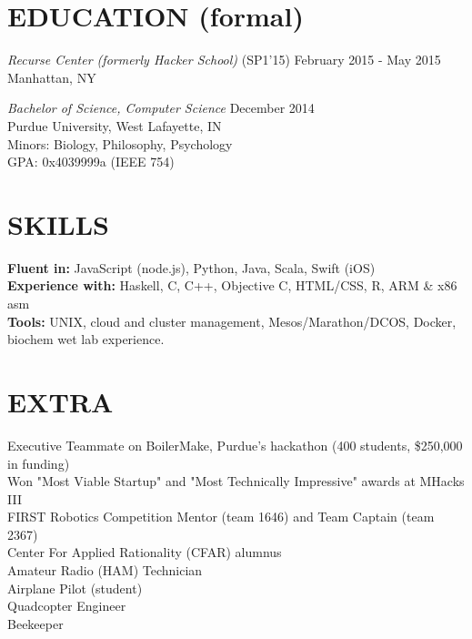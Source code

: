 \documentclass[margin,4pt]{res} %
\begin{document}
\begin{resume}
\section{EDUCATION (formal)}
	{\sl Recurse Center (formerly Hacker School)} \hfill (SP1'15) February 2015 - May 2015\\
		Manhattan, NY

	{\sl Bachelor of Science, Computer Science }\hfill  December 2014\\
		Purdue University, West Lafayette, IN\\
		Minors: Biology, Philosophy, Psychology \\
		GPA: 0x4039999a (IEEE 754)


\section{SKILLS} 
	{\bf Fluent in:} JavaScript (node.js), Python, Java, Scala, Swift (iOS)\\
 	{\bf Experience with:} Haskell, C, C++, Objective C, HTML/CSS, R, ARM \& x86 asm\\
	{\bf Tools:} UNIX, cloud and cluster management, Mesos/Marathon/DCOS, Docker, biochem wet lab experience.


\section{EXTRA}  
	Executive Teammate on BoilerMake, Purdue's hackathon (400 students, \$250,000 in funding)\\
	Won "Most Viable Startup" and "Most Technically Impressive" awards at MHacks III\\
	FIRST Robotics Competition Mentor (team 1646) and Team Captain (team 2367)\\
	Center For Applied Rationality (CFAR) alumnus\\
	Amateur Radio (HAM) Technician\\
	Airplane Pilot (student)\\
	Quadcopter Engineer\\
	Beekeeper\\


\end{resume}
\end{document}
